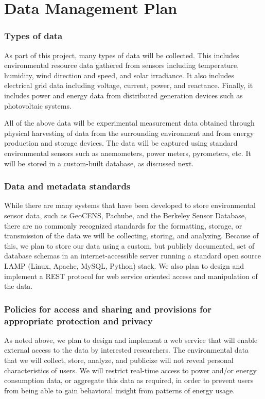 \documentclass{proposalnsf}
\begin{document}
\section*{Data Management Plan}

\subsubsection*{Types of data}

As part of this project, many types of data will be collected.  This
includes environmental resource data gathered from sensors including
temperature, humidity, wind direction and speed, and solar irradiance. It
also includes electrical grid data including voltage, current, power, and
reactance. Finally, it includes power and energy data from distributed
generation devices such as photovoltaic systems.

All of the above data will be experimental measurement data obtained
through physical harvesting of data from the surrounding environment and
from energy production and storage devices.  The data will be captured
using standard environmental sensors such as anemometers, power meters,
pyrometers, etc.  It will be stored in a custom-built database, as
discussed next.

\subsubsection*{Data and metadata standards}

While there are many systems that have been developed to store
environmental sensor data, such as GeoCENS, Pachube, and the Berkeley
Sensor Database, there are no commonly recognized standards for the
formatting, storage, or transmission of the data we will be collecting,
storing, and analyzing.  Because of this, we plan to store our data using a
custom, but publicly documented, set of database schemas in an
internet-accessible server running a standard open source LAMP (Linux,
Apache, MySQL, Python) stack.  We also plan to design and implement a REST
protocol for web service oriented access and manipulation of the data.

\subsubsection*{Policies for access and sharing and provisions for appropriate protection and privacy}

As noted above, we plan to design and implement a web service that will
enable external access to the data by interested researchers.  The
environmental data that we will collect, store, analyze, and publicize will
not reveal personal characteristics of users.  We will restrict real-time
access to power and/or energy consumption data, or aggregate this data as
required, in order to prevent users from being able to gain behavioral
insight from patterns of energy usage.
\end{document}
